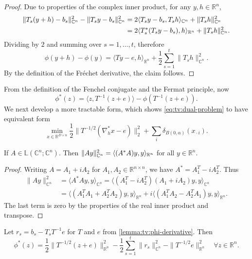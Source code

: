 \documentclass[a4paper,english]{jnsao}
\theoremstyle{definition}
\numberwithin{algorithm}{section}
\newcommand{\df}[2]{#1 ( #2 )}
\newcommand{\nr}[2]{ \| #1 \|_{#2}}
\newcommand{\pd}[2]{ \langle #1,#2 \rangle}
\newcommand{\rea}[1]{\mathbb{R}^{#1}}
\def\linear{\mathbb{L}}
\def\iprod#1#2{\langle #1, #2 \rangle}
\def\R{\mathbb{R}}
\def\C{\mathbb{C}}
\let\Re\relax\DeclareMathOperator{\Re}{Re}
\newcommand{\freevar}{\,\boldsymbol\cdot\,}
\begin{document}
\begin{proof}
    Due to properties of the complex inner product, for any $y, h \in \R ^n$,
    \begin{align*}
        \nr{T_s(y+h) -b_s}{\C^n}^2 - \nr{T_s y -b_s}{\C^n}^2
        &
        = 2 \Re\pd{T_sy-b_s}{T_sh}_{\mathbb{C}^n} + \nr{T_s h}{\C^n}^{2}
        \\
        &
        =
        2 \iprod{\Re T_s^*(T_sy-b_s)}{h}_{\R^n} + \nr{T_s h}{\C^n}^{2}.
    \end{align*}
    Dividing by $2$ and summing over $s=1,\ldots,t$, therefore
    \[
        \df{\phi}{y+h}-\df{\phi}{y}
        =
        \iprod{Ty-e}{h}_{\R^n} + \frac{1}{2} \sum _{s=1}^t \nr{T_s h}{\C^n}^{2}.
    \]
    By the definition of the Fréchet derivative, the claim follows.
\end{proof}

From the definition of the Fenchel conjugate and the Fermat principle, now
\begin{equation}
    \label{eq:tv:phi-conjugate-0}
    \phi ^*(z) = \pd{z}{T^{-1}(z+e)} - \phi(T^{-1}(z+e)).
\end{equation}
We next develop a more tractable form, which shows \eqref{eq:tv:dual-problem} to have equivalent form
\begin{equation}
    \label{eq:tv:equiv-dual}
    \min _{x\in \R^{D\times n}} \frac{1}{2} \nr{T^{-1/2}(\nabla _h^*x-e)}{2}^2 + \sum _i \delta_{B(0,\alpha)}(x_{\freevar i}).
\end{equation}

\begin{lemma}
    \label{lemma:tv:complex-operator-norm}
    If $A \in \linear(\C^n; \C^n)$.
    Then $\nr{Ay}{\C^n}^2 = \pd{\Re(A^*A)y}{y}_{\R^n}$ for all $y\in \R^n$.
\end{lemma}
\begin{proof}
    Writing $A = A_1 +iA_2$ for $A_1,A_2 \in \rea{n\times n}$, we have $A^* = A_1^T -iA_2^T$.
    Thus
    \begin{align*}
        \nr{Ay}{\C^n}^2 &
        =
        \pd{A^*Ay}{y}_{\mathbb{C}^n}
        =\pd{(A_1^T -iA_2^T)(A_1 +iA_2)y}{y}_{\mathbb{C}^n}
        \\
        & = \pd{(A_1^TA_1 + A_2^TA_2)y}{y}_{\R^n} + i\pd{(A_1^TA_2 - A_2^TA_1)y}{y}_{\R^n}.
    \end{align*}
    The last term is zero by the properties of the real inner product and transpose.
\end{proof}

\begin{lemma}
    Let $r_s = b_s - T_sT^{-1}e$ for $T$ and $e$ from \cref{lemma:tv:phi-derivative}.
    Then
    \[
        \phi^*(z)
        = \frac{1}{2} \nr{T^{-1/2}(z+e)}{\R^n}^2 - \frac{1}{2}\sum _{s=1}^t\nr{r_s}{\C^n}^2 - \nr{T^{-1/2}e}{\R^n}^2
        \quad\forall z \in \R^n.
    \]
\end{lemma}
\end{document}
